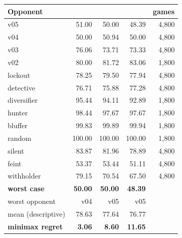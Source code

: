 \begin{tabular}{lrrrr}
\toprule
Opponent & \vsix{} & \vfive{} & \vfour{} & games \\
\midrule
v05 & 51.00 & 50.00 & 48.39 & 4,800 \\
v04 & 50.00 & 50.94 & 50.00 & 4,800 \\
v03 & 76.06 & 73.71 & 73.33 & 4,800 \\
v02 & 80.00 & 81.72 & 83.06 & 1,800 \\
lockout & 78.25 & 79.50 & 77.94 & 4,800 \\
detective & 76.71 & 75.88 & 77.28 & 4,800 \\
diversifier & 95.44 & 94.11 & 92.89 & 1,800 \\
hunter & 98.44 & 97.67 & 97.67 & 1,800 \\
bluffer & 99.83 & 99.89 & 99.94 & 1,800 \\
random & 100.00 & 100.00 & 100.00 & 1,800 \\
silent & 83.87 & 81.96 & 78.89 & 4,800 \\
feint & 53.37 & 53.44 & 51.11 & 4,800 \\
withholder & 79.15 & 70.54 & 67.50 & 4,800 \\
\midrule
\textbf{worst case} & \textbf{50.00} & \textbf{50.00} & \textbf{48.39} & \\
worst opponent & v04 & v05 & v05 & \\
mean (descriptive) & 78.63 & 77.64 & 76.77 & \\
\textbf{minimax regret} & \textbf{3.06} & \textbf{8.60} & \textbf{11.65} & \\
\bottomrule
\end{tabular}
